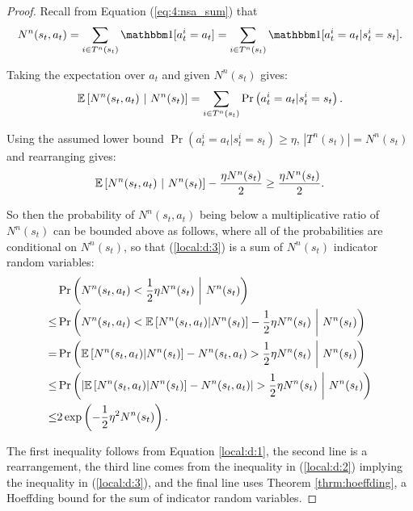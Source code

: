     \begin{proof}
        Recall from Equation (\ref{eq:4:nsa_sum}) that 
        \begin{align}
            N^n(s_t,a_t)=\sum_{i\in T^n(s_t)} \one[a^i_t=a_t] = \sum_{i\in T^n(s_t)} \one[a^i_t=a_t | s^i_t=s_t].
        \end{align} 
        
        Taking the expectation over $a_t$ and given $N^n(s_t)$ gives:
        \begin{align}
            \mathbb{E}\left[N^n(s_t,a_t)\ |\ N^n(s_t)\right] = \sum_{i\in T^n(s_t)} \Pr\left(a^i_t=a_t | s^i_t=s_t\right).
        \end{align}
        
        Using the assumed lower bound $\Pr(a^i_t=a_t|s^i_t=s_t)\geq\eta$, $|T^n(s_t)|=N^n(s_t)$ and rearranging gives:
        \begin{align}
            \mathbb{E}\left[N^n(s_t,a_t)\ |\ N^n(s_t)\right] - \frac{\eta N^n(s_t)}{2} \geq \frac{\eta N^n(s_t)}{2}. \label{local:d:1}
        \end{align}
        
        So then the probability of $N^n(s_t,a_t)$ being below a multiplicative ratio of $N^n(s_t)$ can be bounded above as follows, where all of the probabilities are conditional on $N^n(s_t)$, so that (\ref{local:d:3}) is a sum of $N^n(s_t)$ indicator random variables:
        \begin{align}
            & \Pr\left(N^n(s_t,a_t) < \frac{1}{2}\eta N^n(s_t)\ \bigg|\ N^n(s_t)\right) \\
                \leq & \Pr\left(N^n(s_t,a_t) < \bb{E}\left[N^n(s_t,a_t)|N^n(s_t)\right] - \frac{1}{2}\eta N^n(s_t)\ \bigg|\ N^n(s_t)\right) \\
                = & \Pr\left(\bb{E}\left[N^n(s_t,a_t)|N^n(s_t)\right] - N^n(s_t,a_t) > \frac{1}{2}\eta N^n(s_t)\ \bigg|\ N^n(s_t)\right)
                    \label{local:d:2} \\
                \leq & \Pr\left(\left|\bb{E}\left[N^n(s_t,a_t)|N^n(s_t)\right] - N^n(s_t,a_t)\right| > \frac{1}{2}\eta N^n(s_t)\ \bigg|\ N^n(s_t)\right)
                    \label{local:d:3} \\
                \leq & 2\exp\left(-\frac{1}{2}\eta^2N^n(s_t)\right). \label{eq:bound_nsa}
        \end{align}
        
        The first inequality follows from Equation \eqref{local:d:1}, the second line is a rearrangement, the third line comes from the inequality in (\ref{local:d:2}) implying the inequality in (\ref{local:d:3}), and the final line uses Theorem \ref{thrm:hoeffding}, a Hoeffding bound for the sum of indicator random variables. 
        

\end{proof}
